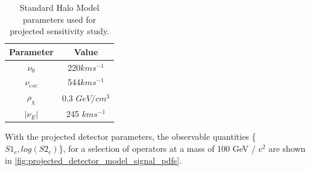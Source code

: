 \begin{table}[]
    \centering
    \begin{tabular}{c|c}
        Parameter         & Value  \\ \hline
        $\nu_0$           & 220$km s^{-1}$ \\
        $\nu_{esc}$       & 544$km s^{-1}$ \\
        $\rho_{\chi}$     & 0.3 $GeV/cm^{3}$ \\
        $|\nu_E|$         & 245 $km s^{-1}$ 
    \end{tabular}
    \caption{Standard Halo Model parameters used for projected sensitivity study.}
    \label{tab:projected_DMFormFactor_parameters}
\end{table}

\par
With the projected detector parameters, the observable quantities \{$S1_c,log(S2_c)$\}, for a selection of operators at a mass of 100 GeV / c$^2$ are shown in \autoref{fig:projected_detector_model_signal_pdfs}.




